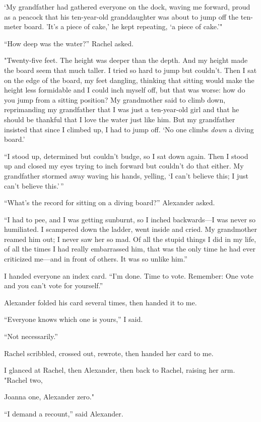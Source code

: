 `My grandfather had gathered everyone on the dock, waving me forward,
proud as a peacock that his ten-year-old granddaughter was about to jump
off the ten-meter board. 'It's a piece of cake,' he kept repeating, `a
piece of cake.'"

``How deep was the water?'' Rachel asked.

"Twenty-five feet. The height was deeper than the depth. And my height
made the board seem that much taller. I tried so hard to jump but
couldn't. Then I sat on the edge of the board, my feet dangling,
thinking that sitting would make the height less formidable and I could
inch myself off, but that was worse: how do you jump from a sitting
position? My grandmother said to climb down, reprimanding my grandfather
that I was just a ten-year-old girl and that he should be thankful that
I love the water just like him. But my grandfather insisted that since I
climbed up, I had to jump off. `No one climbs \emph{down} a diving
board.'

``I stood up, determined but couldn't budge, so I sat down again. Then I
stood up and closed my eyes trying to inch forward but couldn't do that
either. My grandfather stormed away waving his hands, yelling, `I can't
believe this; I just can't believe this.'\,''

``What's the record for sitting on a diving board?'' Alexander asked.

``I had to pee, and I was getting sunburnt, so I inched backwards---I
was never so humiliated. I scampered down the ladder, went inside and
cried. My grandmother reamed him out; I never saw her so mad. Of all the
stupid things I did in my life, of all the times I had really
embarrassed him, that was the only time he had ever criticized me---and
in front of others. It was so unlike him.''

I handed everyone an index card. ``I'm done. Time to vote. Remember: One
vote and you can't vote for yourself.''

Alexander folded his card several times, then handed it to me.

``Everyone knows which one is yours,'' I said.

``Not necessarily.''

Rachel scribbled, crossed out, rewrote, then handed her card to me.

I glanced at Rachel, then Alexander, then back to Rachel, raising her
arm. "Rachel two,

Joanna one, Alexander zero."

``I demand a recount,'' said Alexander.

